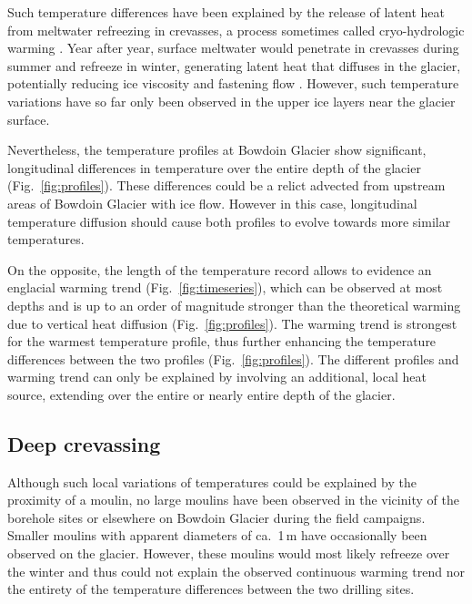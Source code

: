 \documentclass[utf8]{article}
\begin{document}
    Such temperature differences have been explained by the release of latent
    heat from meltwater refreezing in crevasses, a process sometimes called
    cryo-hydrologic warming \citep{Phillips.etal.2010}. Year after year,
    surface meltwater would penetrate in crevasses during summer and refreeze
    in winter, generating latent heat that diffuses in the
    glacier, potentially reducing ice viscosity and fastening flow
    \citep{Phillips.etal.2013}.  However, such temperature variations have so
    far only been observed in the upper ice layers near the glacier surface.

    Nevertheless, the temperature profiles at Bowdoin Glacier show significant,
    longitudinal differences in temperature over the entire depth of the
    glacier (Fig.~\ref{fig:profiles}). These differences could be a relict
    advected from upstream areas
    of Bowdoin Glacier with ice flow. However in this case, longitudinal
    temperature diffusion should cause both profiles to evolve towards more
    similar temperatures.

    On the opposite, the length of the temperature record allows to evidence an
    englacial warming trend (Fig.~\ref{fig:timeseries}), which can be observed
    at most depths and is up to an order of magnitude stronger than the
    theoretical warming due to vertical heat diffusion
    (Fig.~\ref{fig:profiles}). The warming trend is strongest for the warmest
    temperature profile, thus further enhancing the temperature differences
    between the two profiles (Fig.~\ref{fig:profiles}). The different profiles
    and warming trend can only be explained by involving an additional, local
    heat source, extending over the entire or nearly entire depth of the
    glacier.


\subsection{Deep crevassing}

    Although such local variations of temperatures could be explained by the
    proximity of a moulin, no large moulins have been observed in the vicinity
    of the borehole sites or elsewhere on Bowdoin Glacier during the field
    campaigns. Smaller moulins with apparent diameters of ca.~1\,m have
    occasionally been observed on the glacier. However, these moulins would
    most likely refreeze over the winter and thus could not explain the
    observed continuous warming trend nor the entirety of the temperature
    differences between the two drilling sites.
\end{document}
